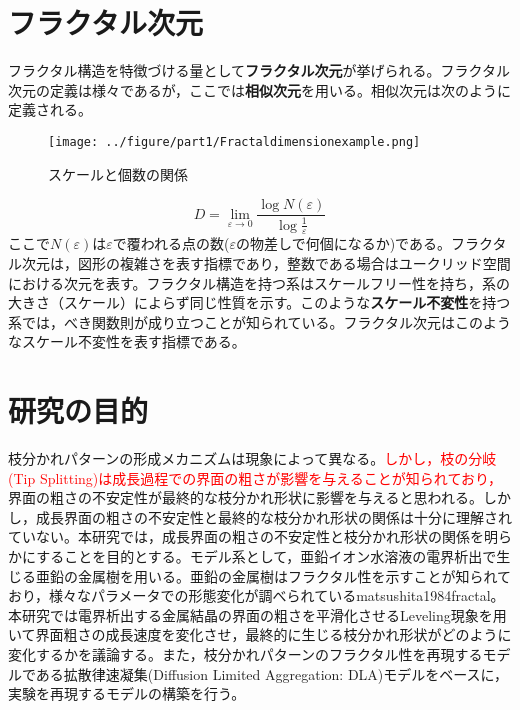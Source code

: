 \documentclass[autodetect-engine,dvi=dvipdfmx,a4paper,ja=standard,oneside,openany,11pt,draft]{bxjsbook}
\begin{document}
\section{フラクタル次元}
フラクタル構造を特徴づける量として\textbf{フラクタル次元}が挙げられる。フラクタル次元の定義は様々であるが，ここでは\textbf{相似次元}を用いる。相似次元は次のように定義される。
\begin{wrapfigure}{r}[0pt]{0.33\textwidth}
  \begin{center}
    \texttt{[image: ../figure/part1/Fractaldimensionexample.png]}
  \end{center}
  \caption{スケールと個数の関係\cite{}}
  \label{fig:相似次元の考え方}
\end{wrapfigure}
\begin{equation}
  D=\lim_{\varepsilon \to 0}\frac{\log N(\varepsilon)}{\log \frac{1}{\varepsilon}}
\end{equation}
ここで$N(\varepsilon)$は$\varepsilon$で覆われる点の数($\varepsilon$の物差しで何個になるか)である。フラクタル次元は，図形の複雑さを表す指標であり，整数である場合はユークリッド空間における次元を表す。フラクタル構造を持つ系はスケールフリー性を持ち，系の大きさ（スケール）によらず同じ性質を示す。このような\textbf{スケール不変性}を持つ系では，べき関数則が成り立つことが知られている。フラクタル次元はこのようなスケール不変性を表す指標である。
\section{研究の目的}
枝分かれパターンの形成メカニズムは現象によって異なる。\textcolor{red}{しかし，枝の分岐(Tip Splitting)は成長過程での界面の粗さが影響を与える\cite{}ことが知られており，}界面の粗さの不安定性が最終的な枝分かれ形状に影響を与えると思われる。しかし，成長界面の粗さの不安定性と最終的な枝分かれ形状の関係は十分に理解されていない。本研究では，成長界面の粗さの不安定性と枝分かれ形状の関係を明らかにすることを目的とする。モデル系として，亜鉛イオン水溶液の電界析出で生じる亜鉛の金属樹を用いる。亜鉛の金属樹はフラクタル性を示すことが知られており\cite{matsushita1984fractal}，様々なパラメータでの形態変化が調べられている\cite{suda2003temperature}{matsushita1984fractal}。本研究では電界析出する金属結晶の界面の粗さを平滑化させるLeveling現象を用いて界面粗さの成長速度を変化させ，最終的に生じる枝分かれ形状がどのように変化するかを議論する。また，枝分かれパターンのフラクタル性を再現するモデルである拡散律速凝集(Diffusion Limited Aggregation: DLA)モデル\cite{witten1981diffusion}をベースに，実験を再現するモデルの構築を行う。

\ifdraft{
  
  
}{}
\end{document}

